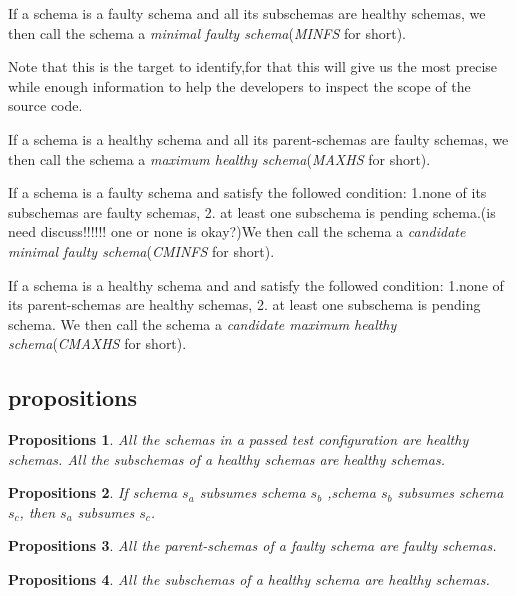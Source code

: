 \documentclass[10pt,journal,cspaper,compsoc]{IEEEtran}
\begin{document}
\begin{definition}
If a schema is a faulty schema and all its subschemas are healthy schemas, we then call the schema a \emph{minimal faulty schema}(\emph{MINFS} for short).

Note that this is the target to identify,for that this will give us the most precise while enough information to help the developers to inspect the scope of the source code.
\end{definition}
\begin{definition}
If a schema is a healthy schema and all its parent-schemas are faulty schemas, we then call the schema a \emph{maximum healthy schema}(\emph{MAXHS} for short).
\end{definition}
\begin{definition}
If a schema is a faulty schema and satisfy the followed condition:
1.none of its subschemas are faulty schemas, 2. at least one subschema is pending schema.(is need discuss!!!!!! one or none is okay?)We then call the schema a \emph{candidate minimal faulty schema}(\emph{CMINFS} for short).
\end{definition}
\begin{definition}
If a schema is a healthy schema and and satisfy the followed condition:
1.none of its  parent-schemas are healthy schemas, 2. at least one subschema is pending schema. We then call the schema a \emph{candidate maximum healthy schema}(\emph{CMAXHS} for short).
\end{definition}
\subsection{propositions}
\newtheorem{proposition}{Propositions}
\begin{proposition}
All the schemas in a passed test configuration are healthy schemas.
All the subschemas of a healthy schemas are healthy schemas.
\end{proposition}
\begin{proposition}
If schema $s_{a}$ subsumes  schema $s_{b}$ ,schema  $s_{b}$ subsumes schema $s_{c}$, then $s_{a}$  subsumes $s_{c}$.
\end{proposition}
\begin{proposition}
All the parent-schemas of a faulty schema are faulty schemas.
\end{proposition}
\begin{proposition}
All the subschemas of a healthy schema are healthy schemas.
\end{proposition}
\end{document}
